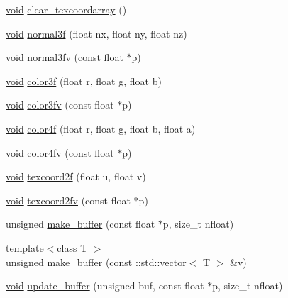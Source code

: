 \begin{DoxyCompactItemize}
\item 
\hyperlink{namespacetrimesh_a784ddfd979e1c579bda795a8edfc3f43}{void} \hyperlink{classtrimesh_1_1GLManager_ade2388d7ddb8ff8bcc3e1b4532d4e92d}{clear\+\_\+texcoordarray} ()
\item 
\hyperlink{namespacetrimesh_a784ddfd979e1c579bda795a8edfc3f43}{void} \hyperlink{classtrimesh_1_1GLManager_afe4faedc9209cad4f27e0d3e359084eb}{normal3f} (float nx, float ny, float nz)
\item 
\hyperlink{namespacetrimesh_a784ddfd979e1c579bda795a8edfc3f43}{void} \hyperlink{classtrimesh_1_1GLManager_a90221eeacad5f590d8a8fedf186ebc0a}{normal3fv} (const float $\ast$p)
\item 
\hyperlink{namespacetrimesh_a784ddfd979e1c579bda795a8edfc3f43}{void} \hyperlink{classtrimesh_1_1GLManager_a5fe3cbf838dee50404bb5c759a16b417}{color3f} (float r, float g, float b)
\item 
\hyperlink{namespacetrimesh_a784ddfd979e1c579bda795a8edfc3f43}{void} \hyperlink{classtrimesh_1_1GLManager_a79a090d35f5bde5c4a62669ae0db4aa6}{color3fv} (const float $\ast$p)
\item 
\hyperlink{namespacetrimesh_a784ddfd979e1c579bda795a8edfc3f43}{void} \hyperlink{classtrimesh_1_1GLManager_a241d4f1194eab865c7f0d1409577831a}{color4f} (float r, float g, float b, float a)
\item 
\hyperlink{namespacetrimesh_a784ddfd979e1c579bda795a8edfc3f43}{void} \hyperlink{classtrimesh_1_1GLManager_add5dc2f7d3732d3a27c93e1da3d71922}{color4fv} (const float $\ast$p)
\item 
\hyperlink{namespacetrimesh_a784ddfd979e1c579bda795a8edfc3f43}{void} \hyperlink{classtrimesh_1_1GLManager_a6676fac0d3c90e7f4ef480f2290316f1}{texcoord2f} (float u, float v)
\item 
\hyperlink{namespacetrimesh_a784ddfd979e1c579bda795a8edfc3f43}{void} \hyperlink{classtrimesh_1_1GLManager_a8675ca3f75d3296c2e68ee2ac4d1b04b}{texcoord2fv} (const float $\ast$p)
\item 
unsigned \hyperlink{classtrimesh_1_1GLManager_a3223f2803989ccfea1634412d7d12bd1}{make\+\_\+buffer} (const float $\ast$p, size\+\_\+t nfloat)
\item 
{\footnotesize template$<$class T $>$ }\\unsigned \hyperlink{classtrimesh_1_1GLManager_ac778f1d2a9f93002c4fd854623ed5010}{make\+\_\+buffer} (const \+::std\+::vector$<$ T $>$ \&v)
\item 
\hyperlink{namespacetrimesh_a784ddfd979e1c579bda795a8edfc3f43}{void} \hyperlink{classtrimesh_1_1GLManager_a49d7833c268ec88d3ba17c28c28ec06b}{update\+\_\+buffer} (unsigned buf, const float $\ast$p, size\+\_\+t nfloat)

\end{DoxyCompactItemize}
